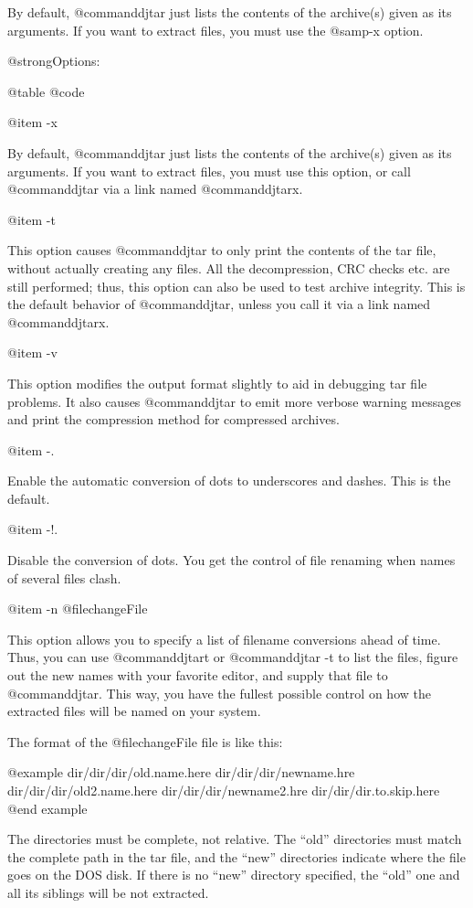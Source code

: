 By default, @command{djtar} just lists the contents of the archive(s)
given as its arguments.  If you want to extract files, you must use
the @samp{-x} option.

@strong{Options:}

@table @code

@item -x

By default, @command{djtar} just lists the contents of the archive(s)
given as its arguments.  If you want to extract files, you must use
this option, or call @command{djtar} via a link named @command{djtarx}.

@item -t

This option causes @command{djtar} to only print the contents of the tar
file, without actually creating any files.  All the decompression, CRC
checks etc. are still performed; thus, this option can also be used to
test archive integrity.  This is the default behavior of
@command{djtar}, unless you call it via a link named @command{djtarx}.

@item -v

This option modifies the output format slightly to aid in debugging tar
file problems.  It also causes @command{djtar} to emit more verbose warning
messages and print the compression method for compressed archives.

@item -.

Enable the automatic conversion of dots to underscores and dashes.  This
is the default.

@item -!.

Disable the conversion of dots.  You get the control of file renaming when
names of several files clash.

@item -n @file{changeFile}

This option allows you to specify a list of filename conversions ahead of
time.  Thus, you can use @command{djtart} or @command{djtar -t} to list the
files, figure out the new names with your favorite editor, and supply that
file to @command{djtar}.  This way, you have the fullest possible control on
how the extracted files will be named on your system.

The format of the @file{changeFile} file is like this:

@example
dir/dir/dir/old.name.here  dir/dir/dir/newname.hre
dir/dir/dir/old2.name.here  dir/dir/dir/newname2.hre
dir/dir/dir.to.skip.here
@end example

The directories must be complete, not relative.  The ``old'' directories
must match the complete path in the tar file, and the ``new'' directories
indicate where the file goes on the DOS disk.  If there is no ``new'' directory
specified, the ``old'' one and all its siblings will be not extracted.

